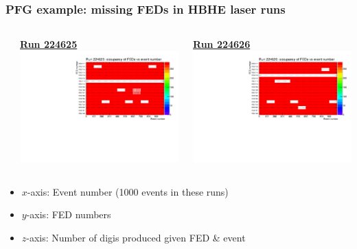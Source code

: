 \documentclass[bigger]{beamer}
\providecommand{\alert}[1]{\textbf{#1}}
\begin{document}
\begin{frame}
\frametitle{PFG example: missing FEDs in HBHE laser runs}
\label{sec-1-1-3}
\begin{columns} %
\label{sec-1-1-3-1}
\begin{column}{0.55\textwidth}
\label{sec-1-1-3-1-1}

\centering
\href{http://cmshcalweb01.cern.ch/DetDiag/Local_HTML/DQM_Hcal_R000224625_0/}{\alert{Run 224625}}
\includegraphics[width=.9\linewidth]{fig/fed_occ_vs_event_Run224625.pdf}
\end{column}
\begin{column}{0.55\textwidth}
\label{sec-1-1-3-1-2}

\centering
\href{http://cmshcalweb01.cern.ch/DetDiag/Local_HTML/DQM_Hcal_R000224625_0/}{\alert{Run 224626}}
\includegraphics[width=.9\linewidth]{fig/fed_occ_vs_event_Run224626.pdf}
\end{column}
\end{columns}
\begin{itemize}

\item $x$-axis: Event number (1000 events in these runs)
\label{sec-1-1-3-2}%

\item $y$-axis: FED numbers
\label{sec-1-1-3-3}%

\item $z$-axis: Number of digis produced given FED \& event
\label{sec-1-1-3-4}%
\end{itemize} %
\end{frame}
\end{document}
